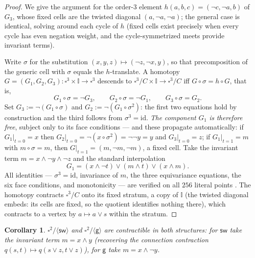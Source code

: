 \documentclass[11pt]{amsart}
\newtheorem{cor}[thm]{Corollary}
\theoremstyle{definition}
\newcommand{\I}{\mathbb{I}}
\newcommand{\sw}{\mathsf{sw}}
\newcommand{\gtw}{\mathsf{g}}
\begin{document}
\begin{proof}
  We give the argument for the order-$3$ element
  $h(a,b,c) = (\neg c, \neg a, b)$ of $G_3$, whose fixed cells are
  the twisted diagonal $(a, \neg a, \neg a)$; the general case is
  identical, solving around each cycle of $h$ (fixed cells exist
  precisely when every cycle has even negation weight, and the
  cycle-symmetrized meets provide invariant terms).

  Write $\sigma$ for the substitution
  $(x,y,z) \mapsto (\neg z, \neg x, y)$, so that precomposition of
  the generic cell with $\sigma$ equals the $h$-translate.  A
  homotopy $G = (G_1, G_2, G_3) : \square^3 \times \I \to
  \square^3$ descends to $\square^3/C \times \I \to \square^3/C$
  iff $G \circ \sigma = h \circ G$, that is,
  \[
    G_1 \circ \sigma = \neg G_3, \qquad
    G_2 \circ \sigma = \neg G_1, \qquad
    G_3 \circ \sigma = G_2 .
  \]
  Set $G_3 := \neg(G_1 \circ \sigma)$ and
  $G_2 := \neg(G_1 \circ \sigma^2)$: the first two equations hold
  by construction and the third follows from $\sigma^3 =
  \mathrm{id}$.  \emph{The component $G_1$ is therefore free},
  subject only to its face conditions --- and these propagate
  automatically: if $G_1|_{t=0} = x$ then $G_2|_{t=0} =
  \neg(x \circ \sigma^2) = \neg\neg y = y$ and $G_3|_{t=0} = z$;
  if $G_1|_{t=1} = m$ with $m \circ \sigma = m$, then
  $G|_{t=1} = (m, \neg m, \neg m)$, a fixed cell.  Take the
  invariant term $m = x \wedge \neg y \wedge \neg z$ and the
  standard interpolation
  \[
    G_1 = (x \wedge \neg t) \vee (m \wedge t) \vee (x \wedge m).
  \]
  All identities --- $\sigma^3 = \mathrm{id}$, invariance of $m$,
  the three equivariance equations, the six face conditions, and
  monotonicity --- are verified on all $256$ literal points
  \cite{Artifact}.  The homotopy contracts $\square^3/C$ onto its
  fixed stratum, a copy of $\I$ (the twisted diagonal embeds:
  its cells are fixed, so the quotient identifies nothing there),
  which contracts to a vertex by $a \mapsto a \vee s$ within the
  stratum.
\end{proof}

\begin{cor}
  \label{cor:squares}
  $\square^2/\langle\sw\rangle$ and
  $\square^2/\langle\gtw\rangle$ are contractible in both
  structures: for $\sw$ take the invariant term $m = x \wedge y$
  (recovering the connection contraction
  $q(s,t) \mapsto q(s \vee z, t \vee z)$), for $\gtw$ take
  $m = x \wedge \neg y$.
\end{cor}
\end{document}
